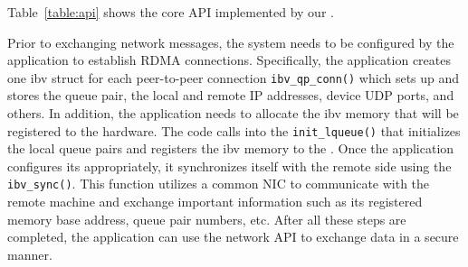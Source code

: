 Table~\ref{table:api} shows the core API implemented by our \projectlibrary{}.
\fi

  Prior to exchanging network messages, the \projecttitle{} system needs to be configured by the application to establish RDMA connections. Specifically, the application creates one ibv struct for each peer-to-peer connection {\tt ibv\_qp\_conn()} which sets up and stores the queue pair, the local and remote IP addresses, device UDP ports, and others. In addition, the application needs to allocate the ibv memory that will be registered to the \projecttitle{} hardware. The code calls into the {\tt init\_lqueue()} that initializes the local queue pairs and registers the ibv memory to the \projecttitle{}. Once the application configures its \projecttitle{} appropriately, it synchronizes itself with the remote side using the {\tt ibv\_sync()}. This function utilizes a common NIC to communicate with the remote machine and exchange important information such as its registered memory base address, queue pair numbers, etc. After all these steps are completed, the application can use the \projecttitle{} network API to exchange data in a secure manner. %

